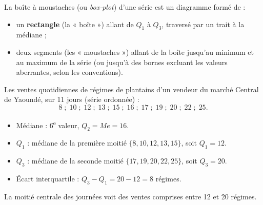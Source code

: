 \documentclass[11pt]{article}
\newcommand{\cle}[1]{{\popxbold\color{popdark}#1}}
\begin{document}
\begin{definition}
La \cle{boîte à moustaches} (ou \emph{box-plot}) d'une série est un diagramme formé de :
\begin{itemize}
\item un \textbf{rectangle} (la « boîte ») allant de $Q_1$ à $Q_3$, traversé par un trait à la médiane ;
\item deux segments (les « moustaches ») allant de la boîte jusqu'au minimum et au maximum de la série (ou jusqu'à des bornes excluant les valeurs aberrantes, selon les conventions).
\end{itemize}
\end{definition}

\begin{exemplebox}
Les ventes quotidiennes de régimes de plantains d'un vendeur du marché Central de Yaoundé, sur 11 jours (série ordonnée) :
\[
8 \;;\; 10 \;;\; 12 \;;\; 13 \;;\; 15 \;;\; 16 \;;\; 17 \;;\; 19 \;;\; 20 \;;\; 22 \;;\; 25.
\]
\begin{itemize}
\item Médiane : $6$\textsuperscript{e} valeur, $Q_2 = Me = 16$.
\item $Q_1$ : médiane de la première moitié $\{8, 10, 12, 13, 15\}$, soit $Q_1 = 12$.
\item $Q_3$ : médiane de la seconde moitié $\{17, 19, 20, 22, 25\}$, soit $Q_3 = 20$.
\item Écart interquartile : $Q_3 - Q_1 = 20 - 12 = 8$ régimes.
\end{itemize}
La moitié centrale des journées voit des ventes comprises entre 12 et 20 régimes.
\end{exemplebox}
\end{document}

